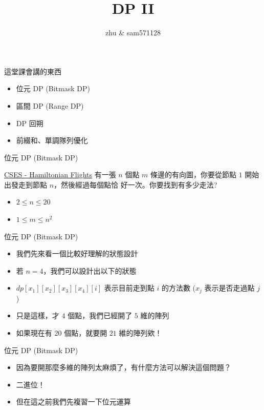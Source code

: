 \documentclass[aspectratio=169]{beamer}
\title{DP II}
\author{zhu \& sam571128}
\date[附中延平競程讀書會]
\begin{document}
    \begin{frame}
        \titlepage
    \end{frame}
    
    \begin{frame}{這堂課會講的東西}
        \begin{itemize}
            \item 位元 DP (Bitmask DP)
            \item 區間 DP (Range DP)
            \item DP 回朔
            \item 前綴和、單調隊列優化
        \end{itemize}
    \end{frame}
    
    \begin{frame}{位元 DP (Bitmask DP)}
        \begin{block}{\href{https://cses.fi/problemset/task/1690}{CSES - Hamiltonian Flights}}
        有一張 $n$ 個點 $m$ 條邊的有向圖，你要從節點 $1$ 開始出發走到節點 $n$，然後經過每個點恰 好一次。你要找到有多少走法?
        \begin{itemize}
            \item $2 \leq n \leq 20$
            \item $1 \leq m \leq n^2$
        \end{itemize}
        \end{block}
    \end{frame}

    \begin{frame}{位元 DP (Bitmask DP)}
        \begin{itemize}
            \item 我們先來看一個比較好理解的狀態設計
            \item 若 $n=4$，我們可以設計出以下的狀態
            \item $dp[x_1][x_2][x_3][x_4][i]$ 表示目前走到點 $i$ 的方法數 ($x_j$ 表示是否走過點 $j$)
            \item 只是這樣，才 $4$ 個點，我們已經開了 $5$ 維的陣列
            \item 如果現在有 $20$ 個點，就要開 $21$ 維的陣列欸！
        \end{itemize}
    \end{frame}
    
    \begin{frame}{位元 DP (Bitmask DP)}
        \begin{itemize}
            \item 因為要開那麼多維的陣列太麻煩了，有什麼方法可以解決這個問題？
            \item 二進位！
            \item 但在這之前我們先複習一下位元運算
        \end{itemize}
    \end{frame}
    
\end{document}
